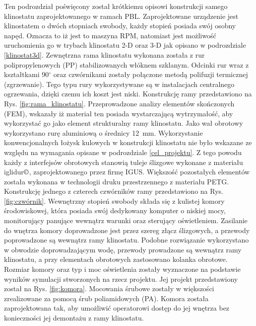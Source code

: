 Ten podrozdział poświęcony został krótkiemu opisowi konstrukcji samego klinostatu
zaprojektowanego w ramach PBL. Zaprojektowane urządzenie jest klinostatem o dwóch stopniach
swobody, każdy stopień posiada swój osobny napęd. Oznacza to iż jest to maszyna RPM, natomiast
jest możliwość uruchomienia go w trybach klinostatu 2-D oraz 3-D jak opisano w podrozdziale
\ref{klinostat3d}. Zewnętrzna rama klinostatu wykonana została z rur polipropylenowych (PP)
stabilizowanych włóknem szklanym. Odcinki rur wraz z kształtkami 90$^\circ$ oraz
czwórnikami zostały połączone metodą polifuzji termicznej (zgrzewanie). Tego typu rury
wykorzystywane są w instalacjach centralnego ogrzewania, dzięki czemu ich koszt jest
niski. Konstrukcję ramy przedstawiono na Rys. \ref{fig:rama_klinostatu}. Przeprowadzone
analizy elementów skończonych (FEM), wskazały iż materiał ten posiada wystarczającą
wytrzymałość, aby wykorzystać go jako element strukturalny ramy klinostatu. Jako wał
obrotowy wykorzystano rurę aluminiową o średnicy \SI{12}{mm}. Wykorzystanie
konwencjonalnych łożysk kulowych w konstrukcji klinostatu nie było wskazane ze
względu na wymagania opisane w podrozdziale \ref{cel_projektu}. Z tego powodu każdy
z interfejsów obrotowych stanowią tuleje ślizgowe wykonane z materiału
iglidur$\copyright$, zaprojektowanego przez firmę IGUS. Większość pozostałych
elementów została wykonana \linebreak w technologii druku przestrzennego z materiału PETG.
Konstrukcję jednego \linebreak z czterech czwórników ramy przedstawiono na Rys.
\ref{fig:czwórnik}. Wewnętrzny stopień swobody składa się z kulistej komory
środowiskowej, która posiada swój dedykowany komputer o niskiej mocy,
monitorujący panujące wewnątrz warunki oraz sterujący oświetleniem.
Zasilanie do wnętrza komory doprowadzone jest przez szereg złącz
ślizgowych, a przewody poprowadzone są wewnątrz ramy klinostatu. Podobne
rozwiązanie wykorzystano w obwodzie doprowadzającym wodę, przewody
prowadzone są wewnątrz ramy klinostatu, a przy elementach obrotowych
zastosowano kolanka obrotowe. Rozmiar komory oraz typ i moc oświetlenia
zostały wyznaczone na podstawie wyników symulacji stworzonych na rzecz
projektu. Jej projekt przedstawiony został na Rys. \ref{fig:komora}.
Mocowania śrubowe zostały w większości zrealizowane za pomocą śrub
poliamidowych (PA). Komora została zaprojektowana tak, aby umożliwić operatorowi dostęp do jej
wnętrza bez konieczności jej demontażu \linebreak z ramy klinostatu.

